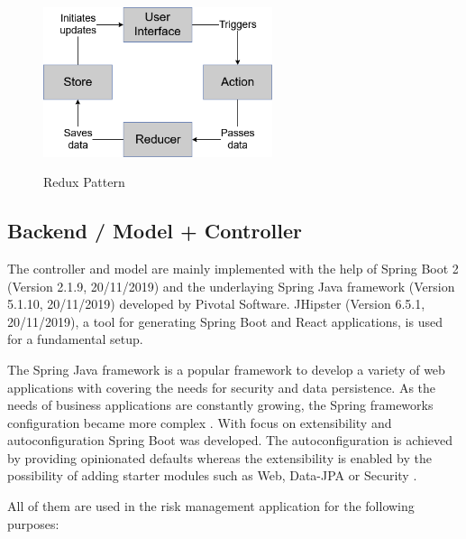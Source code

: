 \begin{figure}[H]
	\centering
	\includegraphics[width=0.6\textwidth]{Content/Domain/ReduxPattern.png}
	\caption{Redux Pattern}
	\cite{own representation}
	\label{fig:reduxpattern}
\end{figure}

\subsection{Backend / Model + Controller}
\label{sec:DomainCc}
The controller and model are mainly implemented with the help of Spring Boot 2 (Version 2.1.9, 20/11/2019) and the underlaying Spring Java framework (Version 5.1.10,  20/11/2019) developed by Pivotal Software. JHipster (Version 6.5.1, 20/11/2019), a tool for generating Spring Boot and React applications, is used for a fundamental setup.

The Spring Java framework is a popular framework to develop a variety of web applications with covering the needs for security and data persistence. As the needs of business applications are constantly growing, the Spring frameworks configuration became more complex \cite[p. 1]{prasadreddyBeginningSpringBoot2017}. With focus on extensibility and autoconfiguration Spring Boot was developed. The autoconfiguration is achieved by providing opinionated defaults whereas the extensibility is enabled by the possibility of adding starter modules such as Web, Data-\ac{JPA}  or Security \cite[p. 21-22]{prasadreddyBeginningSpringBoot2017}. 

All of them are used in the risk management application for the following purposes:

